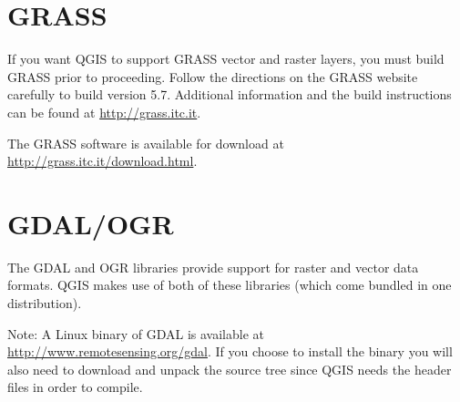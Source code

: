 \section{GRASS}
If you want QGIS to support GRASS vector and raster layers, you must build GRASS prior to proceeding. 
Follow the directions on the GRASS website carefully to build version 5.7. Additional information and the build instructions can be found at \url{http://grass.itc.it}.
 
The GRASS software is available for download at \url{http://grass.itc.it/download.html}.

\section{GDAL/OGR}
  The GDAL and OGR libraries provide support for raster and vector data formats. QGIS makes use of both of these libraries (which come bundled in one distribution).

  Note: A Linux binary of GDAL is available at \url{http://www.remotesensing.org/gdal}. If you choose to install the binary you will also need to download and unpack the source tree since QGIS needs the header files in order to compile.
  
